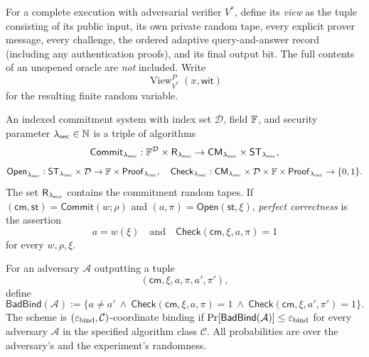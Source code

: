 \begin{definition}\label{def:security:view}
For a complete execution with adversarial verifier $V^*$, define its \emph{view} as the tuple consisting of its public input, its own private random tape, every explicit prover message, every challenge, the ordered adaptive query-and-answer record (including any authentication proofs), and its final output bit. The full contents of an unopened oracle are \emph{not} included.
Write
\[
 \operatorname{View}_{V^*}^{P}(x,\mathsf{wit})
\]
for the resulting finite random variable.
\end{definition}

\begin{definition}\label{def:security:commitment}
An indexed commitment system with index set $\mathcal D$, field $\mathbb{F}$, and security parameter $\lambda_{\rm sec}\in\mathbb N$ is a triple of algorithms
\[
 \mathsf{Commit}_{\lambda_{\rm sec}}:\mathbb{F}^{\mathcal D}\times\mathsf R_{\lambda_{\rm sec}}
       \to\mathsf{CM}_{\lambda_{\rm sec}}\times\mathsf{ST}_{\lambda_{\rm sec}},
\]
\[
 \mathsf{Open}_{\lambda_{\rm sec}}:
    \mathsf{ST}_{\lambda_{\rm sec}}\times\mathcal D
      \to\mathbb{F}\times\mathsf{Proof}_{\lambda_{\rm sec}},
\quad
 \mathsf{Check}_{\lambda_{\rm sec}}:
    \mathsf{CM}_{\lambda_{\rm sec}}\times\mathcal D
    \times\mathbb{F}\times\mathsf{Proof}_{\lambda_{\rm sec}}\to\{0,1\}.
\]
The set $\mathsf R_{\lambda_{\rm sec}}$ contains the commitment random tapes.
If $(\mathsf{cm},\mathsf{st})=\mathsf{Commit}(w;\rho)$ and
$(a,\pi)=\mathsf{Open}(\mathsf{st},\xi)$, \emph{perfect correctness} is the assertion
\[
  a=w(\xi)\quad\text{and}\quad
  \mathsf{Check}(\mathsf{cm},\xi,a,\pi)=1
\]
for every $w,\rho,\xi$.
\end{definition}

\begin{definition}\label{def:security:binding}
For an adversary $\mathcal A$ outputting a tuple
\[
 (\mathsf{cm},\xi,a,\pi,a',\pi'),
\]
define
\[
 \mathsf{BadBind}(\mathcal A)
 :=
 \bigl\{a\neq a'\ \land\
 \mathsf{Check}(\mathsf{cm},\xi,a,\pi)=1\ \land\
 \mathsf{Check}(\mathsf{cm},\xi,a',\pi')=1\bigr\}.
\]
The scheme is $(\varepsilon_{\rm bind},\mathcal C)$-coordinate binding if
$\Pr[\mathsf{BadBind}(\mathcal A)]\leq\varepsilon_{\rm bind}$
for every adversary $\mathcal A$ in the specified algorithm class $\mathcal C$.
All probabilities are over the adversary's and the experiment's randomness.
\end{definition}

